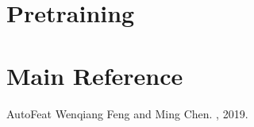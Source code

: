 \documentclass[letterpaper,11pt,english]{sphinxmanual}
\begin{document}
\chapter{Pre\sphinxhyphen{}training}
\label{\detokenize{pretraining:pre-training}}\label{\detokenize{pretraining:pretraining}}\label{\detokenize{pretraining::doc}}
\sphinxstepscope


\chapter{Main Reference}
\label{\detokenize{reference:main-reference}}\label{\detokenize{reference:reference}}\label{\detokenize{reference::doc}}
\begin{sphinxthebibliography}{AutoFeat}
\sphinxAtStartPar
Wenqiang Feng and Ming Chen.
, 2019.
\end{sphinxthebibliography}



\renewcommand{\indexname}{Index}
\printindex
\end{document}
